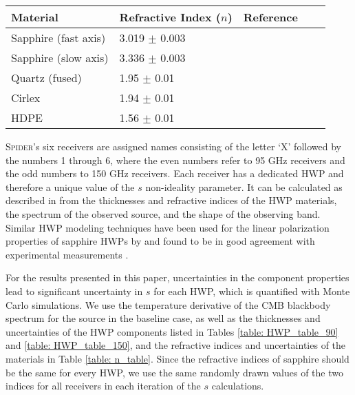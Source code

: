 \documentclass[twocolumn]{aastex61}
\begin{document}
\begin{table*}
\begin{center}
    \begin{tabular}{ *5l } 
    \toprule
    Material & Refractive Index ($n$) & Reference \\ \midrule
    Sapphire (fast axis) & 3.019 $\pm$ 0.003  &	\citet{bryanSPIE}  \\ 
    Sapphire (slow axis) & 3.336 $\pm$ 0.003 &	\citet{bryanSPIE} \\ 
    Quartz (fused)  & 1.95 $\pm$ 0.01 & \citet{Sean_thesis} \\
    Cirlex & 1.94 $\pm$ 0.01 & \citet{Sean_thesis} \\
    HDPE & 1.56 $\pm$ 0.01 & \citet{LambMaterials} \\
    \bottomrule
    \end{tabular}
    \caption{Refractive indices of the HWP materials.  The listed values assume a temperature of approximately 4 K and observing bands in the range of 50-200 GHz.}
    \label{table: n_table}
\end{center}
\end{table*}

\textsc{Spider}'s six receivers are assigned names consisting of the letter `X' followed by the numbers 1 through 6, where the even numbers refer to 95 GHz receivers and the odd numbers to 150 GHz receivers.  Each receiver has a dedicated HWP and therefore a unique value of the $s$ non-ideality parameter.  It can be calculated as described in \citet{bryan2010modeling} from the thicknesses and refractive indices of the HWP materials, the spectrum of the observed source, and the shape of the observing band.  Similar HWP modeling techniques have been used for the linear polarization properties of sapphire HWPs by \citet{Cardiff_modeling1} and found to be in good agreement with experimental measurements \citep{Cardiff_measurement1, SCUBA2_HWP, Sean_thesis}.  

For the results presented in this paper, uncertainties in the component properties lead to significant uncertainty in $s$ for each HWP, which is quantified with Monte Carlo simulations.  We use the temperature derivative of the CMB blackbody spectrum for the source in the baseline case, as well as the thicknesses and uncertainties of the HWP components listed in Tables \ref{table: HWP_table_90} and \ref{table: HWP_table_150}, and the refractive indices and uncertainties of the materials in Table \ref{table: n_table}.  Since the refractive indices of sapphire should be the same for every HWP, we use the same randomly drawn values of the two indices for all receivers in each iteration of the $s$ calculations.
\end{document}
